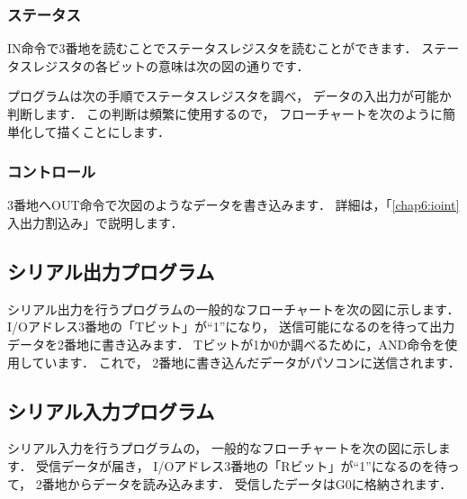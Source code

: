 \subsubsection{ステータス}
IN命令で3番地を読むことでステータスレジスタを読むことができます．
ステータスレジスタの各ビットの意味は次の図の通りです．

\begin{center}
\end{center}

プログラムは次の手順でステータスレジスタを調べ，
データの入出力が可能か判断します．
この判断は頻繁に使用するので，
フローチャートを次のように簡単化して描くことにします．

\begin{center}
\end{center}

\subsubsection{コントロール}
3番地へOUT命令で次図のようなデータを書き込みます．
詳細は，「\ref{chap6:ioint} 入出力割込み」で説明します．

\begin{center}
\end{center}

\newpage
\subsection{シリアル出力プログラム}
シリアル出力を行うプログラムの一般的なフローチャートを次の図に示します．
I/Oアドレス3番地の「Tビット」が``1''になり，
送信可能になるのを待って出力データを2番地に書き込みます．
Tビットが1か0か調べるために，AND命令を使用しています．
これで，%
2番地に書き込んだデータがパソコンに送信されます．

\begin{center}
\end{center}

\subsection{シリアル入力プログラム}
シリアル入力を行うプログラムの，
一般的なフローチャートを次の図に示します．
受信データが届き，
I/Oアドレス3番地の「Rビット」が``1''になるのを待って，
2番地からデータを読み込みます．
受信したデータはG0に格納されます．

